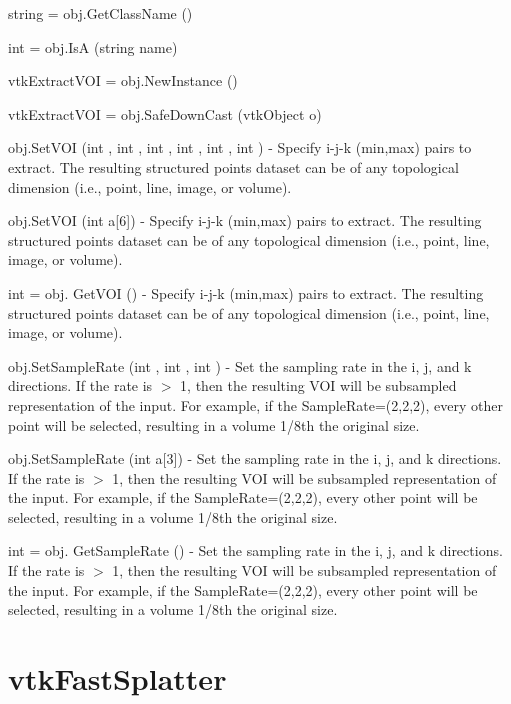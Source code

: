\begin{DoxyItemize}
\item {\ttfamily string = obj.\-Get\-Class\-Name ()}  
\item {\ttfamily int = obj.\-Is\-A (string name)}  
\item {\ttfamily vtk\-Extract\-V\-O\-I = obj.\-New\-Instance ()}  
\item {\ttfamily vtk\-Extract\-V\-O\-I = obj.\-Safe\-Down\-Cast (vtk\-Object o)}  
\item {\ttfamily obj.\-Set\-V\-O\-I (int , int , int , int , int , int )} -\/ Specify i-\/j-\/k (min,max) pairs to extract. The resulting structured points dataset can be of any topological dimension (i.\-e., point, line, image, or volume).  
\item {\ttfamily obj.\-Set\-V\-O\-I (int a\mbox{[}6\mbox{]})} -\/ Specify i-\/j-\/k (min,max) pairs to extract. The resulting structured points dataset can be of any topological dimension (i.\-e., point, line, image, or volume).  
\item {\ttfamily int = obj. Get\-V\-O\-I ()} -\/ Specify i-\/j-\/k (min,max) pairs to extract. The resulting structured points dataset can be of any topological dimension (i.\-e., point, line, image, or volume).  
\item {\ttfamily obj.\-Set\-Sample\-Rate (int , int , int )} -\/ Set the sampling rate in the i, j, and k directions. If the rate is $>$ 1, then the resulting V\-O\-I will be subsampled representation of the input. For example, if the Sample\-Rate=(2,2,2), every other point will be selected, resulting in a volume 1/8th the original size.  
\item {\ttfamily obj.\-Set\-Sample\-Rate (int a\mbox{[}3\mbox{]})} -\/ Set the sampling rate in the i, j, and k directions. If the rate is $>$ 1, then the resulting V\-O\-I will be subsampled representation of the input. For example, if the Sample\-Rate=(2,2,2), every other point will be selected, resulting in a volume 1/8th the original size.  
\item {\ttfamily int = obj. Get\-Sample\-Rate ()} -\/ Set the sampling rate in the i, j, and k directions. If the rate is $>$ 1, then the resulting V\-O\-I will be subsampled representation of the input. For example, if the Sample\-Rate=(2,2,2), every other point will be selected, resulting in a volume 1/8th the original size.  
\end{DoxyItemize}\hypertarget{vtkimaging_vtkfastsplatter}{}\section{vtk\-Fast\-Splatter}\label{vtkimaging_vtkfastsplatter}
